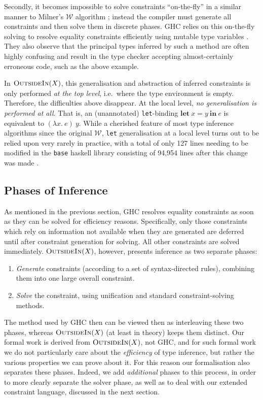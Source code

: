 \documentclass[a4paper]{jfp}
\newcommand{\outsidein}{\textsc{OutsideIn}(X)}
\begin{document}
Secondly, it becomes impossible to solve constraints ``on-the-fly'' in a similar manner to Milner's $\mathcal{W}$ algorithm \cite{Milner78atheory};
instead the compiler must generate all constraints and then solve them in discrete phases. GHC relies on this on-the-fly solving to resolve equality
constraints efficiently using mutable type variables \cite{Jones:2007dr}. They also observe that the principal types inferred by such a method are
often highly confusing and result in the type checker accepting almost-certainly erroneous code, such as the above example. 

In $\outsidein$, this generalisation and abstraction of inferred constraints is only performed \emph{at the top level}, i.e.\ where the type
environment is empty. Therefore, the difficulties above disappear. At the local level, \emph{no generalisation is performed at all}. That is, an
(unannotated) {\tt let}-binding $\mathbf{let}\ x = y\ \mathbf{in}\ e$ is equivalent to $(\lambda x.\ e)\ y$. While a cherished
feature of most type inference algorithms since the original $\mathcal{W}$, {\tt let} generalisation at a local level turns out to be relied upon very
rarely in practice, with a total of only 127 lines needing to be modified in the {\tt base} haskell library consisting of 94,954 lines after this
change was made \cite{Vytiniotis:2010ja}. 


\subsection{Phases of Inference}

As mentioned in the previous section, GHC resolves equality constraints as soon as they can be solved for efficiency reasons.
Specifically, only those constraints which rely on information not available when they are generated are deferred until after constraint generation
for solving. All other constraints are solved immediately.  $\outsidein$, however, presents inference as two separate phases:

\begin{enumerate}
\item \emph{Generate} constraints (according to a set of syntax-directed rules), combining them into one large overall constraint.
\item \emph{Solve} the constraint, using unification and standard constraint-solving methods.	
\end{enumerate} 

The method used by GHC then can be viewed then as interleaving these two phases, whereas $\outsidein$ (at least in theory) keeps them distinct. Our
formal work is derived from $\outsidein$, not GHC, and for such formal work we do not particularly care about the \emph{efficiency} of type inference,
but rather the various properties we can prove about it. For this reason our formalisation also separates these phases. Indeed, we add
\emph{additional} phases to this process, in order to more clearly separate the solver phase, as well as to deal with our extended constraint
language, discussed in the next section. 
\end{document}

